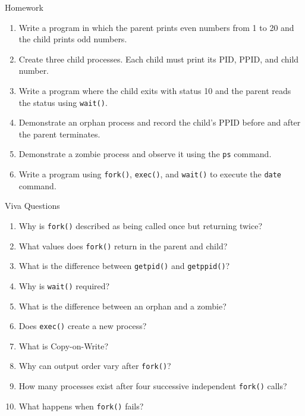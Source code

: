 \documentclass[aspectratio=169]{beamer}
\begin{document}
\begin{frame}{Homework}

\begin{enumerate}
    \item Write a program in which the parent prints even numbers from 1 to 20
    and the child prints odd numbers.

    \item Create three child processes. Each child must print its PID, PPID, and
    child number.

    \item Write a program where the child exits with status 10 and the parent
    reads the status using \texttt{wait()}.

    \item Demonstrate an orphan process and record the child's PPID before and
    after the parent terminates.

    \item Demonstrate a zombie process and observe it using the \texttt{ps}
    command.

    \item Write a program using \texttt{fork()}, \texttt{exec()}, and
    \texttt{wait()} to execute the \texttt{date} command.
\end{enumerate}

\end{frame}

\begin{frame}{Viva Questions}

\begin{enumerate}
    \item Why is \texttt{fork()} described as being called once but returning
    twice?
    \item What values does \texttt{fork()} return in the parent and child?
    \item What is the difference between \texttt{getpid()} and
    \texttt{getppid()}?
    \item Why is \texttt{wait()} required?
    \item What is the difference between an orphan and a zombie?
    \item Does \texttt{exec()} create a new process?
    \item What is Copy-on-Write?
    \item Why can output order vary after \texttt{fork()}?
    \item How many processes exist after four successive independent
    \texttt{fork()} calls?
    \item What happens when \texttt{fork()} fails?
\end{enumerate}

\end{frame}
\end{document}
